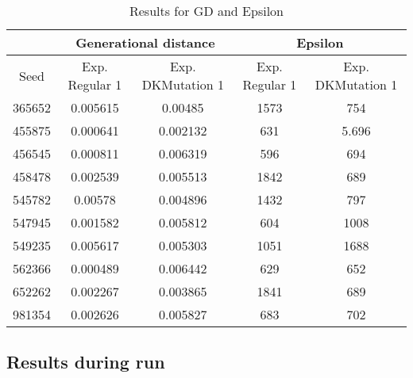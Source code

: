 \documentclass{article}
\begin{document}
\begin{table}[h]
\caption{Results for GD and Epsilon}
\label{table:results GD and Epsilon}
\begin{tabular}{c|cc|cc} \hline
\multicolumn{1}{l}{} & \multicolumn{2}{c}{Generational distance} & \multicolumn{2}{c}{Epsilon}        \\ \hline
Seed                 & Exp. Regular 1     & Exp. DKMutation 1    & Exp. Regular 1 & Exp. DKMutation 1 \\ \hline
365652               & 0.005615           &\cellcolor[gray]{0.8} 0.00485              & 1573           & \cellcolor[gray]{0.8}754               \\
455875               & \cellcolor[gray]{0.8}0.000641           & 0.002132             & 631            & \cellcolor[gray]{0.8}5.696             \\
456545               & \cellcolor[gray]{0.8}0.000811           & 0.006319             & \cellcolor[gray]{0.8}596            & 694               \\
458478               & \cellcolor[gray]{0.8}0.002539           & 0.005513             & 1842           & \cellcolor[gray]{0.8}689               \\
545782               & 0.00578            & \cellcolor[gray]{0.8}0.004896             & 1432           & \cellcolor[gray]{0.8}797               \\
547945               & \cellcolor[gray]{0.8}0.001582           & 0.005812             & \cellcolor[gray]{0.8}604            & 1008              \\
549235               & 0.005617           & \cellcolor[gray]{0.8}0.005303             & \cellcolor[gray]{0.8}1051           & 1688              \\
562366               & \cellcolor[gray]{0.8}0.000489           & 0.006442             & \cellcolor[gray]{0.8}629            & 652               \\
652262               & \cellcolor[gray]{0.8}0.002267           & 0.003865             & 1841           & \cellcolor[gray]{0.8}689               \\
981354               & \cellcolor[gray]{0.8}0.002626           & 0.005827             & \cellcolor[gray]{0.8}683            & 702  \\ \hline            
\end{tabular}
\end{table}

\subsection{Results during run}
\end{document}
